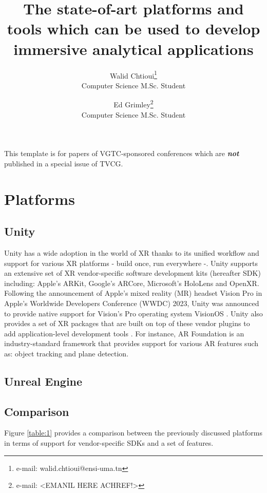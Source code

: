 \documentclass{vgtc}                          %
\title{The state-of-art
platforms and tools which can be used to develop immersive analytical
applications}
\author{Walid Chtioui\thanks{e-mail: walid.chtioui@ensi-uma.tn}\\ %
        \scriptsize Computer Science M.Sc. Student %
\and Ed Grimley\thanks{e-mail: <EMANIL HERE ACHREF!>}\\ %
     \scriptsize Computer Science M.Sc. Student}
\begin{document}
\maketitle
This template is for papers of VGTC-sponsored conferences which are
\emph{\textbf{not}} published in a special issue of TVCG.

\section{Platforms}
\subsection{Unity}
Unity has a wide adoption in the world of XR thanks to its unified workflow
and support for various XR platforms - build once, run
everywhere -. Unity supports an extensive set of XR vendor-specific software
development kits (hereafter SDK) including: Apple's ARKit, Google's ARCore,
Microsoft's HoloLens and OpenXR. Following the announcement of Apple's
mixed reality (MR) headset Vision Pro in Apple's Worldwide Developers
Conference (WWDC) 2023, Unity was announced to provide native support for
Vision's Pro operating system VisionOS \cite{web:vision_pro_unity}.
Unity also provides a set of XR packages that are built on top of these vendor
plugins to add application-level development tools \cite{unity:xr_packages}.
For instance, AR Foundation is an industry-standard framework that provides
support for various AR features such as: object tracking and plane detection.
\subsection{Unreal Engine}
\subsection{Comparison}
Figure \ref{table:1} provides a comparison between the previously discussed
platforms in terms of support for vendor-specific SDKs and a set of features.
\end{document}
